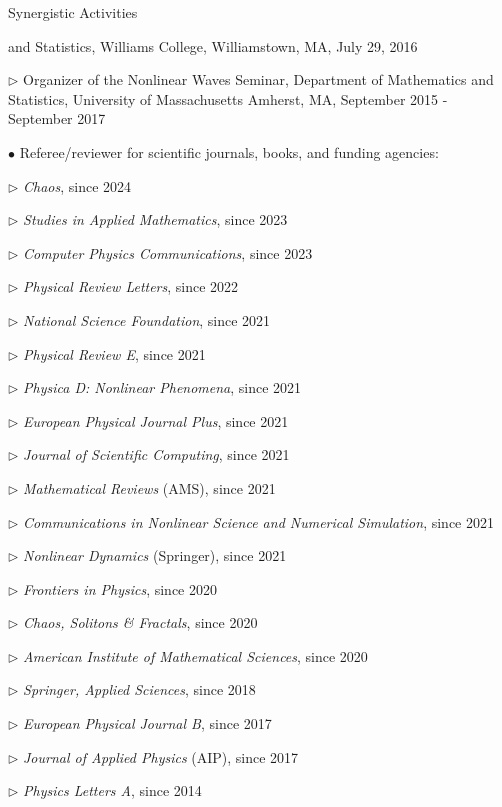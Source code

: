 \documentclass[10pt]{article} %
\newenvironment{outerlist}[1][\enskip\textbullet]%
        {\begin{itemize}[#1]}{\end{itemize}%
         \vspace{-.6\baselineskip}}
\newenvironment{innerlist}[1][\enskip\textbullet]%
        {\begin{compactitem}[#1]}{\end{compactitem}}
\begin{document}
\begin{section}{Synergistic Activities}
\begin{outerlist}
\begin{innerlist}
                        and Statistics, Williams College, Williamstown, MA, July 29, 2016      
\item[$\triangleright$] Organizer of the Nonlinear Waves Seminar, Department of Mathematics and Statistics,
University of Massachusetts Amherst, MA, September 2015 - September 2017
\end{innerlist} 
\item[$\bullet$] Referee/reviewer for scientific journals, books, and funding agencies:
\begin{innerlist}
\item[$\triangleright$] \textit{Chaos}, since 2024
\item[$\triangleright$] \textit{Studies in Applied Mathematics}, since 2023
\item[$\triangleright$] \textit{Computer Physics Communications}, since 2023
\item[$\triangleright$] \textit{Physical Review Letters}, since 2022
\item[$\triangleright$] \textit{National Science Foundation}, since 2021
\item[$\triangleright$] \textit{Physical Review E}, since 2021
\item[$\triangleright$] \textit{Physica D: Nonlinear Phenomena}, since 2021
\item[$\triangleright$] \textit{European Physical Journal Plus}, since 2021
\item[$\triangleright$] \textit{Journal of Scientific Computing}, since 2021
\item[$\triangleright$] \textit{Mathematical Reviews} (AMS), since 2021 
\item[$\triangleright$] \textit{Communications in Nonlinear Science and Numerical Simulation}, since 2021
\item[$\triangleright$] \textit{Nonlinear Dynamics} (Springer), since 2021 
\item[$\triangleright$] \textit{Frontiers in Physics}, since 2020
\item[$\triangleright$] \textit{Chaos, Solitons \& Fractals}, since 2020
\item[$\triangleright$] \textit{American Institute of Mathematical Sciences}, since 2020
\item[$\triangleright$] \textit{Springer, Applied Sciences}, since 2018
\item[$\triangleright$] \textit{European Physical Journal B}, since 2017
\item[$\triangleright$] \textit{Journal of Applied Physics} (AIP), since 2017
\item[$\triangleright$] \textit{Physics Letters A}, since 2014
\end{innerlist}

\end{outerlist}

\end{section}
\end{document}
